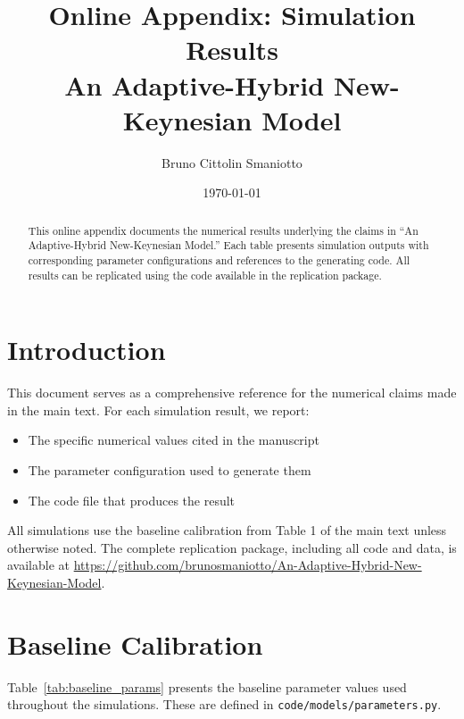 \documentclass[11pt]{article}
\title{Online Appendix: Simulation Results\\[0.5em]
\large An Adaptive-Hybrid New-Keynesian Model}
\author{Bruno Cittolin Smaniotto}
\date{\today}
\begin{document}
\maketitle

\begin{abstract}
This online appendix documents the numerical results underlying the claims in ``An Adaptive-Hybrid New-Keynesian Model.'' Each table presents simulation outputs with corresponding parameter configurations and references to the generating code. All results can be replicated using the code available in the replication package.
\end{abstract}

\tableofcontents
\newpage

\section{Introduction}

This document serves as a comprehensive reference for the numerical claims made in the main text. For each simulation result, we report:
\begin{itemize}
    \item The specific numerical values cited in the manuscript
    \item The parameter configuration used to generate them
    \item The code file that produces the result
\end{itemize}

All simulations use the baseline calibration from Table 1 of the main text unless otherwise noted. The complete replication package, including all code and data, is available at \url{https://github.com/brunosmaniotto/An-Adaptive-Hybrid-New-Keynesian-Model}.

\section{Baseline Calibration}
\label{sec:calibration}

Table~\ref{tab:baseline_params} presents the baseline parameter values used throughout the simulations. These are defined in \texttt{code/models/parameters.py}.
\end{document}

